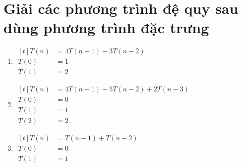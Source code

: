 \documentclass[12pt, letterpaper]{article}
\begin{document}
\section{Giải các phương trình đệ quy sau dùng phương trình đặc trưng}
\begin{enumerate}
    \item $ \begin{aligned}[t]
            T(n) &= 4T(n - 1) - 3T(n-2) \\
            T(0) &= 1 \\
            T(1) &= 2
    \end{aligned} $

    \item $ \begin{aligned}[t]
            T(n) &= 4T(n - 1) - 5T(n - 2) + 2T(n - 3) \\
            T(0) &= 0 \\
            T(1) &= 1 \\
            T(2) &= 2
    \end{aligned} $

    \item $ \begin{aligned}[t]
            T(n) &= T(n - 1) + T(n - 2) \\
            T(0) &= 0 \\
            T(1) &= 1
    \end{aligned} $

\end{enumerate}
\end{document}
